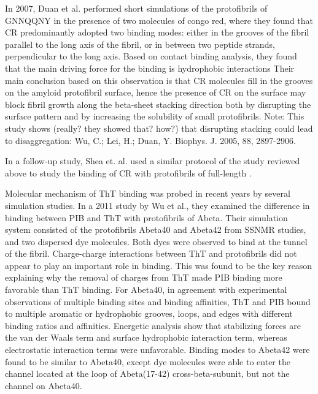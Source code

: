 In 2007, Duan et al.\cite{Wu:2007p361} performed short simulations of the protofibrils of GNNQQNY in the presence of two molecules of congo red, where they found that CR predominantly adopted two binding modes: either in the grooves of the fibril parallel to the long axis of the fibril, or in between two peptide strands, perpendicular to the long axis. Based on contact binding analysis, they found that the main driving force for the binding is hydrophobic interactions Their main conclusion based on this observation is that CR molecules fill in the grooves on the amyloid protofibril surface, hence the presence of CR on the surface may block fibril growth along the beta-sheet stacking direction both by disrupting the surface pattern and by increasing the solubility of small protofibrils. Note: This study shows (really? they showed that? how?) that disrupting stacking could lead to disaggregation:  Wu, C.; Lei, H.; Duan, Y. Biophys. J. 2005, 88, 2897-2906. 

In a follow-up study, Shea et. al. used a similar protocol of the study reviewed above to study the binding of CR with protofibrils of full-length .

Molecular mechanism of ThT binding was probed in recent years by several simulation studies. In a 2011 study by Wu et al.,\cite{Wu:2011fd} they examined the difference in binding between PIB and ThT with protofibrils of Abeta. Their simulation system consisted of the protofibrils Abeta40 and Abeta42 from SSNMR studies, and two dispersed dye molecules. Both dyes were observed to bind at the tunnel of the fibril. Charge-charge interactions between ThT and protofibrils did not appear to play an important role in binding. This was found to be the key reason explaining why the removal of charges from ThT made PIB binding more favorable than ThT binding. For Abeta40, in agreement with experimental observations of multiple binding sites and binding affinities, ThT and PIB bound to multiple aromatic or hydrophobic grooves, loops, and edges with different binding ratios and affinities.   Energetic analysis show that stabilizing forces are the van der Waals term and surface hydrophobic interaction term, whereas electrostatic interaction terms were unfavorable. Binding modes to Abeta42 were found to be similar to Abeta40, except dye molecules were able to enter the channel located at the loop of Abeta(17-42) cross-beta-subunit, but not the channel on Abeta40.




